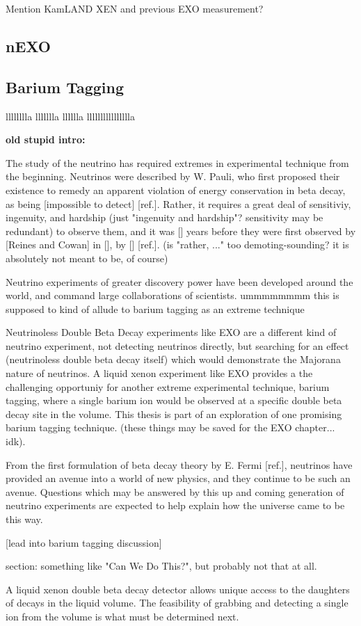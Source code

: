 Mention KamLAND XEN and previous EXO measurement?

\subsection{nEXO}

\subsection{Barium Tagging}

lllllllla llllllla lllllla lllllllllllllllla

\noindent
{\color{gray}\textbf{old stupid intro:}

The study of the neutrino has required extremes in experimental technique from the beginning.  Neutrinos were described by W. Pauli, who first proposed their existence to remedy an apparent violation of energy conservation in beta decay, as being [impossible to detect] [ref.].  Rather, it requires a great deal of sensitiviy, ingenuity, and hardship (just "ingenuity and hardship"?  sensitivity may be redundant) to observe them, and it was [] years before they were first observed by [Reines and Cowan] in [], by [] [ref.].  (is "rather, ..." too demoting-sounding?  it is absolutely not meant to be, of course)

Neutrino experiments of greater discovery power have been developed around the world, and command large collaborations of scientists.  ummmmmmmm  this is supposed to kind of allude to barium tagging as an extreme technique

Neutrinoless Double Beta Decay experiments like EXO are a different kind of neutrino experiment, not detecting neutrinos directly, but searching for an effect (neutrinoless double beta decay itself) which would demonstrate the Majorana nature of neutrinos.  A liquid xenon experiment like EXO provides a the challenging opportuniy for another extreme experimental technique, barium tagging, where a single barium ion would be observed at a specific double beta decay site in the volume.  This thesis is part of an exploration of one promising barium tagging technique.  (these things may be saved for the EXO chapter... idk).

From the first formulation of beta decay theory by E. Fermi [ref.], neutrinos have provided an avenue into a world of new physics, and they continue to be such an avenue.  Questions which may be answered by this up and coming generation of neutrino experiments are expected to help explain how the universe came to be this way.

[lead into barium tagging discussion]

section: something like "Can We Do This?", but probably not that at all.

A liquid xenon double beta decay detector allows unique access to the daughters of decays in the liquid volume.  The feasibility of grabbing and detecting a single ion from the volume is what must be determined next.}